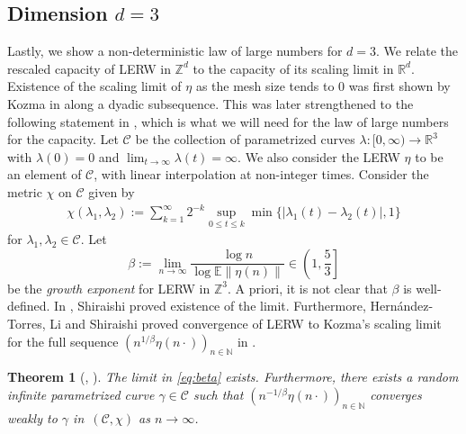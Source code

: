 \documentclass{article}
\newcommand{\R}{\mathbb{R}}
\newcommand{\Z}{\mathbb{Z}}
\newcommand{\N}{\mathbb{N}}
\newcommand{\E}{\mathbb{E}}
\newcommand{\1}{\mathbf{1}}
\newcommand{\limn}{\lim_{n\rightarrow\infty}}
\newtheorem{theorem}{Theorem}
\theoremstyle{definition}
\numberwithin{equation}{section}
\numberwithin{theorem}{section}
\begin{document}
\subsection{Dimension \texorpdfstring{$d=3$}{d=3}}\label{sec:d3res}
Lastly, we show a non-deterministic law of large numbers for $d=3$. We relate the rescaled capacity of LERW in $\Z^d$ to the capacity of its scaling limit in $\R^d$. Existence of the scaling limit of $\eta$ as the mesh size tends to 0 was first shown by Kozma in \cite{kozma2007scaling} along a dyadic subsequence. This was later strengthened to the following statement in \cite{hernandez2024sharp}, which is what we will need for the law of large numbers for the capacity. Let $\mathcal{C}$ be the collection of parametrized curves $\lambda\colon[0,\infty)\to\R^3$ with $\lambda(0)=0$ and $\lim_{t\rightarrow\infty}\lambda(t)=\infty$. We also consider the LERW $\eta$ to be an element of $\mathcal{C}$, with linear interpolation at non-integer times. Consider the metric $\chi$ on $\mathcal{C}$ given by 
\begin{equation}\label{eq:def-chi-lerw}
    \begin{split}
        \chi(\lambda_1,\lambda_2):=\sum_{k=1}^\infty2^{-k}\sup_{0\leq t\leq k}\min\{|\lambda_1(t)-\lambda_2(t)|,1\}
    \end{split}
\end{equation}
for $\lambda_1,\lambda_2\in\mathcal{C}$. Let 
\begin{equation}\label{eq:beta}
    \beta:=\limn\frac{\log n}{\log\E\|\eta(n)\|}\in\left(1,\frac{5}{3}\right]
\end{equation}
be the \emph{growth exponent} for LERW in $\Z^3$. A priori, it is not clear that $\beta$ is well-defined. In \cite{shiraishi2018growth}, Shiraishi proved existence of the limit. Furthermore, Hern\'andez-Torres, Li and Shiraishi proved convergence of LERW to Kozma's scaling limit for the full sequence $(n^{1/\beta}\eta(n\cdot))_{n\in\N}$ in \cite{hernandez2024sharp}.
\begin{theorem}[\cite{shiraishi2018growth}, \cite{hernandez2024sharp}]\label{th:scalinglim3d}
The limit in \eqref{eq:beta} exists. Furthermore, there exists a random infinite parametrized curve $\gamma\in\mathcal{C}$ such that $(n^{-1/\beta}\eta(n\cdot))_{n\in\N}$ converges weakly to $\gamma$ in~$(\mathcal{C},\chi)$ as $n\rightarrow\infty$.
\end{theorem}
\end{document}
